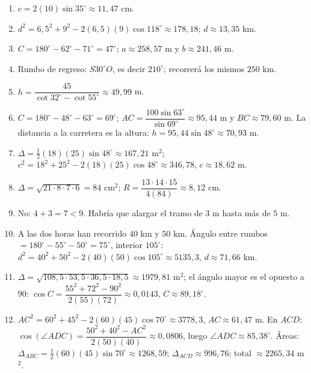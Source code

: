 \documentclass[12pt, letterpaper]{article}
\providecommand{\sen}{\sin}
\begin{document}
\begin{enumerate}[leftmargin=*, label=\textbf{\arabic*.}, start=76]
  \item $c=2(10)\sen 35^\circ\approx 11{,}47$ cm.
  \item $d^2=6{,}5^2+9^2-2(6{,}5)(9)\cos 118^\circ\approx 178{,}18$; $d\approx 13{,}35$ km.
  \item $C=180^\circ-62^\circ-71^\circ=47^\circ$; $a\approx 258{,}57$ m y $b\approx 241{,}46$ m.
  \item Rumbo de regreso: $S30^\circ O$, es decir $210^\circ$; recorrerá los mismos $250$ km.
  \item $h=\dfrac{45}{\cot 32^\circ-\cot 55^\circ}\approx 49{,}99$ m.
  \item $C=180^\circ-48^\circ-63^\circ=69^\circ$; $AC=\dfrac{100\sen 63^\circ}{\sen 69^\circ}\approx 95{,}44$ m y $BC\approx 79{,}60$ m. La distancia a la carretera es la altura: $h=95{,}44\sen 48^\circ\approx 70{,}93$ m.
  \item $\Delta=\tfrac12(18)(25)\sen 48^\circ\approx 167{,}21$ m$^2$; $c^2=18^2+25^2-2(18)(25)\cos 48^\circ\approx 346{,}78$, $c\approx 18{,}62$ m.
  \item $\Delta=\sqrt{21\cdot8\cdot7\cdot6}=84$ cm$^2$; $R=\dfrac{13\cdot14\cdot15}{4(84)}\approx 8{,}12$ cm.
  \item No: $4+3=7<9$. Habría que alargar el tramo de $3$ m hasta más de $5$ m.
  \item A las dos horas han recorrido $40$ km y $50$ km. Ángulo entre rumbos $=180^\circ-55^\circ-50^\circ=75^\circ$, interior $105^\circ$: $d^2=40^2+50^2-2(40)(50)\cos 105^\circ\approx 5135{,}3$, $d\approx 71{,}66$ km.
  \item $\Delta=\sqrt{108{,}5\cdot53{,}5\cdot36{,}5\cdot18{,}5}\approx 1979{,}81$ m$^2$; el ángulo mayor es el opuesto a $90$: $\cos C=\dfrac{55^2+72^2-90^2}{2(55)(72)}\approx 0{,}0143$, $C\approx 89{,}18^\circ$.
  \item $AC^2=60^2+45^2-2(60)(45)\cos 70^\circ\approx 3778{,}3$, $AC\approx 61{,}47$ m. En $ACD$: $\cos(\angle ADC)=\dfrac{50^2+40^2-AC^2}{2(50)(40)}\approx 0{,}0806$, luego $\angle ADC\approx 85{,}38^\circ$. Áreas: $\Delta_{ABC}=\tfrac12(60)(45)\sen 70^\circ\approx 1268{,}59$; $\Delta_{ACD}\approx 996{,}76$; total $\approx 2265{,}34$ m$^2$.
\end{enumerate}
\end{document}
